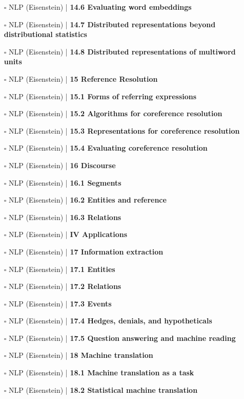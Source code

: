 \documentclass[a4, landscape, 12pt]{article}
\newcommand{\checkbox}{$\square$}%
\begin{document}
\begin{itemize}
{}
\item [\checkbox]  NLP (Eisenstein) | \textbf{ 14.6 Evaluating word embeddings
}
\item [\checkbox]  NLP (Eisenstein) | \textbf{ 14.7 Distributed representations beyond distributional statistics
}
\item [\checkbox]  NLP (Eisenstein) | \textbf{ 14.8 Distributed representations of multiword units
}
\item [\checkbox]  NLP (Eisenstein) | \textbf{ 15 Reference Resolution
}
\item [\checkbox]  NLP (Eisenstein) | \textbf{ 15.1 Forms of referring expressions
}
\item [\checkbox]  NLP (Eisenstein) | \textbf{ 15.2 Algorithms for coreference resolution
}
\item [\checkbox]  NLP (Eisenstein) | \textbf{ 15.3 Representations for coreference resolution
}
\item [\checkbox]  NLP (Eisenstein) | \textbf{ 15.4 Evaluating coreference resolution
}
\item [\checkbox]  NLP (Eisenstein) | \textbf{ 16 Discourse
}
\item [\checkbox]  NLP (Eisenstein) | \textbf{ 16.1 Segments
}
\item [\checkbox]  NLP (Eisenstein) | \textbf{ 16.2 Entities and reference
}
\item [\checkbox]  NLP (Eisenstein) | \textbf{ 16.3 Relations
}
\item [\checkbox]  NLP (Eisenstein) | \textbf{ IV Applications
}
\item [\checkbox]  NLP (Eisenstein) | \textbf{ 17 Information extraction
}
\item [\checkbox]  NLP (Eisenstein) | \textbf{ 17.1 Entities
}
\item [\checkbox]  NLP (Eisenstein) | \textbf{ 17.2 Relations
}
\item [\checkbox]  NLP (Eisenstein) | \textbf{ 17.3 Events
}
\item [\checkbox]  NLP (Eisenstein) | \textbf{ 17.4 Hedges, denials, and hypotheticals
}
\item [\checkbox]  NLP (Eisenstein) | \textbf{ 17.5 Question answering and machine reading
}
\item [\checkbox]  NLP (Eisenstein) | \textbf{ 18 Machine translation
}
\item [\checkbox]  NLP (Eisenstein) | \textbf{ 18.1 Machine translation as a task
}
\item [\checkbox]  NLP (Eisenstein) | \textbf{ 18.2 Statistical machine translation
}
\end{itemize}
\end{document}
